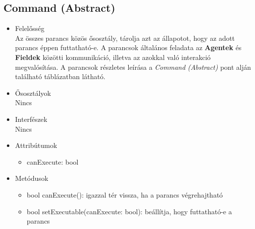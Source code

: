 \subsection{Command (Abstract)}
\begin{itemize}

\item Felelősség\\
    Az összes parancs közös ősosztály, tárolja azt az állapotot, hogy az adott parancs éppen futtatható-e. A parancsok általános feladata az \textbf{Agentek} és \textbf{Fieldek} közötti kommunikáció, illetva az azokkal való interakció megvalósítása. A parancsok részletes leírása a \textit{Command (Abstract)} pont alján található táblázatban látható.

\item Ősosztályok\\
Nincs

\item Interfészek\\
Nincs

\item Attribútumok\\
    \begin{itemize}
            \item canExecute: bool
    \end{itemize}

\item Metódusok\\

\begin{itemize}
    \item bool canExecute(): igazzal tér vissza, ha a parancs végrehajtható
    \item bool setExecutable(canExecute: bool): beállítja, hogy futtatható-e a parancs
\end{itemize}

\end{itemize}


